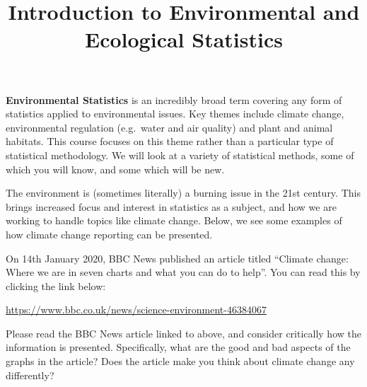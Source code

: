 \documentclass[
  letterpaper,
  DIV=11,
  numbers=noendperiod]{scrartcl}
\title{Introduction to Environmental and Ecological Statistics}
\author{}
\date{}
\makeatletter
\renewcommand{\maketitle}{\bgroup\setlength{\parindent}{0pt}
\begin{flushleft}
  {\color{uniblue}\sffamily\huge\textbf{\@title}} \vspace{0.3cm} \newline
  {\Large {\@subtitle}} \newline
  \@author
\end{flushleft}\egroup
}
\makeatother
\begin{document}
\maketitle

\pagestyle{mystyle}

\textbf{Environmental Statistics} is an incredibly broad term covering
any form of statistics applied to environmental issues. Key themes
include climate change, environmental regulation (e.g.~water and air
quality) and plant and animal habitats. This course focuses on this
theme rather than a particular type of statistical methodology. We will
look at a variety of statistical methods, some of which you will know,
and some which will be new.

The environment is (sometimes literally) a burning issue in the 21st
century. This brings increased focus and interest in statistics as a
subject, and how we are working to handle topics like climate change.
Below, we see some examples of how climate change reporting can be
presented.

\begin{tcolorbox}[enhanced jigsaw, opacityback=0, coltitle=black, opacitybacktitle=0.6, breakable, toprule=.15mm, bottomtitle=1mm, title={BBC News article on climate change}, colback=white, leftrule=.75mm, titlerule=0mm, toptitle=1mm, arc=.35mm, bottomrule=.15mm, rightrule=.15mm, colframe=quarto-callout-note-color-frame, colbacktitle=quarto-callout-note-color!10!white, left=2mm]

On 14th January 2020, BBC News published an article titled ``Climate
change: Where we are in seven charts and what you can do to help''. You
can read this by clicking the link below:

\url{https://www.bbc.co.uk/news/science-environment-46384067}

\end{tcolorbox}

\begin{tcolorbox}[enhanced jigsaw, opacityback=0, coltitle=black, opacitybacktitle=0.6, breakable, toprule=.15mm, bottomtitle=1mm, title={Exercise 1}, colback=white, leftrule=.75mm, titlerule=0mm, toptitle=1mm, arc=.35mm, bottomrule=.15mm, rightrule=.15mm, colframe=quarto-callout-tip-color-frame, colbacktitle=quarto-callout-tip-color!10!white, left=2mm]

Please read the BBC News article linked to above, and consider
critically how the information is presented. Specifically, what are the
good and bad aspects of the graphs in the article? Does the article make
you think about climate change any differently?

\end{tcolorbox}
\end{document}
